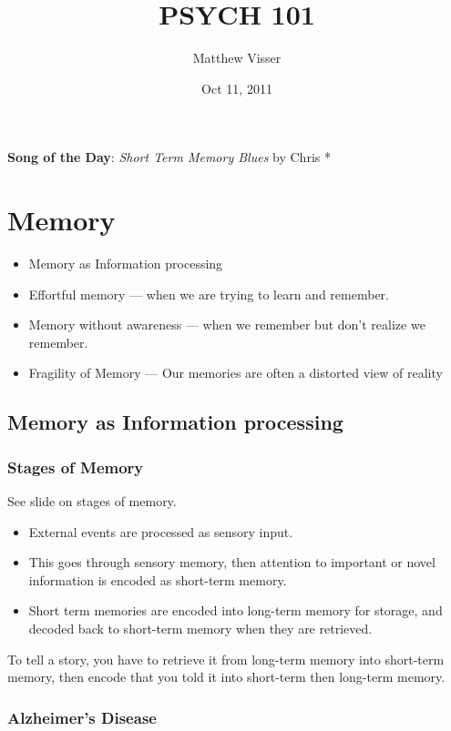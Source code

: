\documentclass[12pt]{article}
\begin{document}
\title{PSYCH 101}
\author{Matthew Visser}
\date{Oct 11, 2011}
\maketitle

\textbf{Song of the Day}: \emph{Short Term Memory Blues} by Chris *

\section{Memory}

\begin{itemize}
	\item Memory as Information processing
	\item Effortful memory --- when we are trying to learn and remember.
	\item Memory without awareness --- when we remember but don't realize we
		remember.
	\item Fragility of Memory --- Our memories are often a distorted view of
		reality
\end{itemize}


\subsection{Memory as Information processing}
\subsubsection{Stages of Memory}


See slide on stages of memory.
\begin{itemize}
	\item External events are processed as sensory input.
	\item This goes through sensory memory, then attention to important or novel
		information is encoded as short-term memory.
	\item Short term memories are encoded into long-term memory for storage, and
		decoded back to short-term memory when they are retrieved.
\end{itemize}

To tell a story, you have to retrieve it from long-term memory into short-term
memory, then encode that you told it into short-term then long-term memory.

\subsubsection{Alzheimer's Disease}
\end{document}
